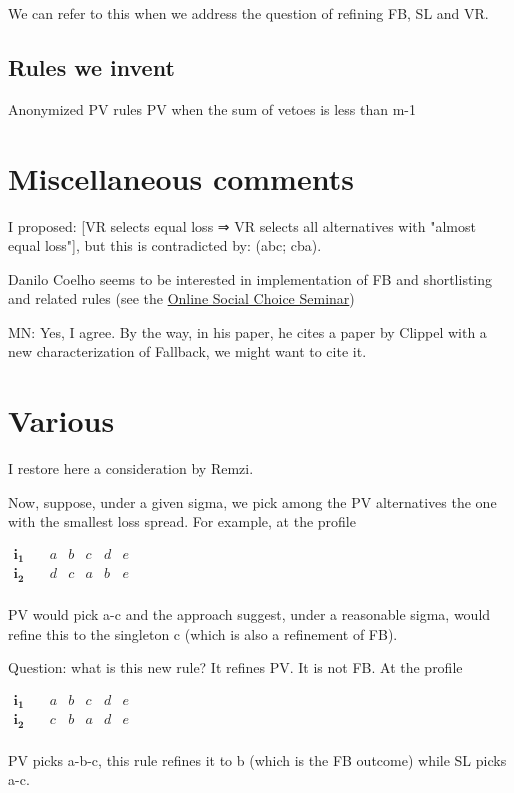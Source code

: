 \documentclass[version=3.21, pagesize, twoside=off, bibliography=totoc, DIV=calc, fontsize=12pt, a4paper]{scrartcl}
\begin{document}
We can refer to this when we address the question of refining FB, SL and VR.









\subsection{Rules we invent}
Anonymized PV rules
PV when the sum of vetoes is less than m-1
\section{Miscellaneous comments}
I proposed: [VR selects equal loss ⇒ VR selects all alternatives with "almost equal loss"], but this is contradicted by: (abc; cba).


Danilo Coelho seems to be interested in implementation of FB and shortlisting and related rules (see the \href{https://www.cmss.auckland.ac.nz/2020/06/03/online-social-choice-seminar-series/}{Online Social Choice Seminar})

\color{green}MN: Yes, I agree. By the way, in his paper, he cites a paper by Clippel with a new characterization of Fallback, we might want to cite it.\color{black}



\appendix
\section{Various}
I restore here a consideration by Remzi.

\begin{remark}[Consideration]
Now, suppose, under a given sigma, we pick among the PV alternatives the one with the smallest loss spread. For example, at the profile 
\begin{center}
	$
	\begin{array}{cccccc}
		\mathbf{i_1} \quad &a&b&c&d&e\\
		\mathbf{i_2} \quad &d&c&a&b&e\\
	\end{array}
	$
\end{center}

PV would pick a-c and the approach suggest, under a reasonable sigma, would refine this to the singleton c (which is also a refinement of FB).

Question: what is this new rule? It refines PV. It is not FB. At the profile

\begin{center}
	$
	\begin{array}{cccccc}
		\mathbf{i_1} \quad &a&b&c&d&e\\
		\mathbf{i_2} \quad &c&b&a&d&e\\
	\end{array}
	$
\end{center}

PV picks a-b-c, this rule refines it to b (which is the FB outcome) while SL picks a-c.
\end{remark}
\end{document}

